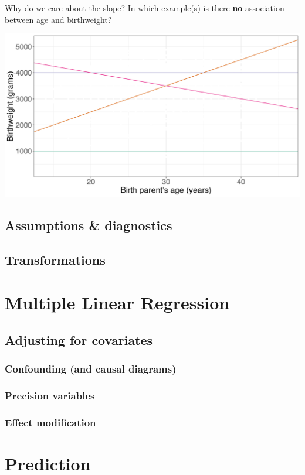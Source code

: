 \documentclass[10pt,t]{beamer}
\begin{document}
\begin{frame}{Why do we care about the slope?}
In which example(s) is there \textbf{no} association between age and birthweight?

\vspace{0.3cm}

\centering \includegraphics[scale=0.35]{zeroslopes.png}

\end{frame}

\subsection{Assumptions \& diagnostics}

\subsection{Transformations}

\section{Multiple Linear Regression}

\subsection{Adjusting for covariates}

\subsubsection{Confounding (and causal diagrams)}

\subsubsection{Precision variables}

\subsubsection{Effect modification}

\section{Prediction}
\end{document}
